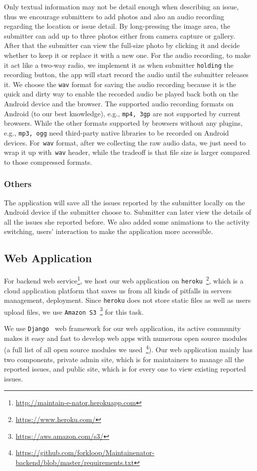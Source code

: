 \documentclass{acm_proc_article-sp}
\begin{document}
Only textual information may not be detail enough when describing an issue, thus we encourage submitters to add photos and 
also an audio recording regarding the location or issue detail. By long-pressing the image area,
the submitter can add up to three photos either from camera capture or gallery. After that the submitter can view the full-size photo by
clicking it and decide whether to keep it or replace it with a new one. For the audio recording, to make it act like a two-way radio,
we implement it as when submitter \texttt{holding} the recording button, the app will start record the audio until the submitter releases it.
We choose the \texttt{wav} format for saving the audio recording because it is the quick and dirty way to enable the recorded
audio be played back both on the Android device and the browser.
The supported audio recording formats on Android (to our best knowledge), e.g., \texttt{mp4, 3gp} are not supported by current browsers. 
While the other formats supported by browsers without any plugins, e.g., \texttt{mp3, ogg} need third-party native libraries to be recorded on Android devices. 
For~\texttt{wav} format, after we collecting the raw audio data, we just need to wrap it up with~\texttt{wav} header, 
while the tradeoff is that file size is larger compared to those compressed formats.

\subsubsection{Others}
The application will save all the issues reported by the submitter locally on the Android device if the submitter choose to. Submitter can later
view the details of all the issues she reported before. We also added some animations to the activity switching, users' interaction to make the application more accessible.

\subsection{Web Application}
For backend web service\footnote{\url{http://maintain-e-nator.herokuapp.com}}, 
we host our web application on \texttt{heroku}~\footnote{\url{https://www.heroku.com/}}, which is a
cloud application platform that saves us from all kinds of pitfalls in servers management, deployment. 
Since \texttt{heroku} does not store static files as well as users upload files, 
we use \texttt{Amazon S3}~\footnote{\url{https://aws.amazon.com/s3/}} for this task.

We use \texttt{Django}~\cite{django} web framework for our web application, its active community makes it easy and fast to develop web apps 
with numerous open source modules 
(a full list of all open source modules we used~\footnote{\url{https://github.com/forkloop/Maintainenator-backend/blob/master/requirements.txt}}). 
Our web application mainly has two components, private admin site, which is for maintainers to
manage all the reported issues, and public site, which is for every one to view existing reported issues.
\end{document}
